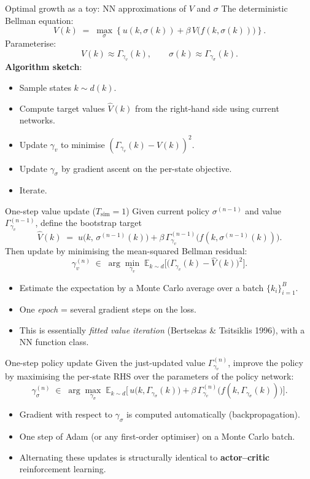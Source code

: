 \begin{frame}{Optimal growth as a toy: NN approximations of $V$ and $\sigma$}
The deterministic Bellman equation:
\[
V(k) \;=\; \max_{\sigma}\!\left\{u(k,\sigma(k)) + \beta\, V\!\big(f(k,\sigma(k))\big)\right\}.
\]
\medskip
Parameterise:
\[
V(k) \approx \Gamma_{\gamma_v}(k), \qquad \sigma(k) \approx \Gamma_{\gamma_\sigma}(k).
\]
\medskip
\textbf{Algorithm sketch}:
\begin{itemize}
\item Sample states $k \sim d(k)$.
\item Compute target values $\hat V(k)$ from the right-hand side using current networks.
\item Update $\gamma_v$ to minimise $(\Gamma_{\gamma_v}(k) - \hat V(k))^2$.
\item Update $\gamma_\sigma$ by gradient ascent on the per-state objective.
\item Iterate.
\end{itemize}
\end{frame}

\begin{frame}{One-step value update ($T_{\text{sim}}=1$)}
Given current policy $\sigma^{(n-1)}$ and value $\Gamma_{\gamma_v}^{(n-1)}$, define the bootstrap target
\[
\hat V(k) \;=\; u\!\big(k,\, \sigma^{(n-1)}(k)\big) + \beta\,\Gamma_{\gamma_v}^{(n-1)}\!\big(f(k, \sigma^{(n-1)}(k))\big).
\]
\medskip
Then update by minimising the mean-squared Bellman residual:
\[
\gamma_v^{(n)} \;\in\; \arg\min_{\gamma_v}\; \mathbb{E}_{k\sim d}\Big[\big(\Gamma_{\gamma_v}(k) - \hat V(k)\big)^2\Big].
\]
\medskip
\begin{itemize}
\item Estimate the expectation by a Monte Carlo average over a batch $\{k_i\}_{i=1}^{B}$.
\item One \emph{epoch} = several gradient steps on the loss.
\item This is essentially \emph{fitted value iteration} (Bertsekas \& Tsitsiklis 1996), with a NN function class.
\end{itemize}
\end{frame}

\begin{frame}{One-step policy update}
Given the just-updated value $\Gamma_{\gamma_v}^{(n)}$, improve the policy by maximising the per-state RHS over the parameters of the policy network:
\[
\gamma_\sigma^{(n)} \;\in\; \arg\max_{\gamma_\sigma}\;
\mathbb{E}_{k\sim d}\Big[\,u\!\big(k,\Gamma_{\gamma_\sigma}(k)\big) + \beta\,\Gamma_{\gamma_v}^{(n)}\!\big(f(k,\Gamma_{\gamma_\sigma}(k))\big)\Big].
\]
\medskip
\begin{itemize}
\item Gradient with respect to $\gamma_\sigma$ is computed automatically (backpropagation).
\item One step of Adam (or any first-order optimiser) on a Monte Carlo batch.
\item Alternating these updates is structurally identical to \textbf{actor--critic} reinforcement learning.
\end{itemize}
\end{frame}

